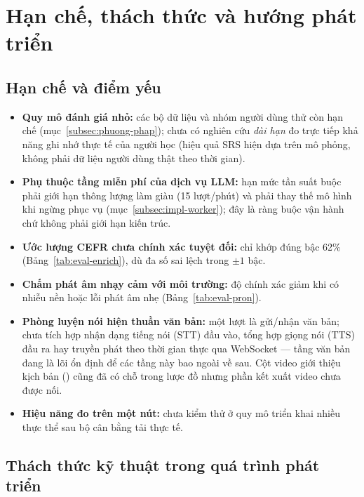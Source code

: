 \section{Hạn chế, thách thức và hướng phát triển}
\label{sec:han-che}

\subsection{Hạn chế và điểm yếu}
\label{subsec:han-che}

\begin{itemize}
  \item \textbf{Quy mô đánh giá nhỏ:} các bộ dữ liệu và nhóm người dùng thử
        còn hạn chế (mục~\ref{subsec:phuong-phap}); chưa có nghiên cứu
        \textit{dài hạn} đo trực tiếp khả năng ghi nhớ thực tế của người học
        (hiệu quả SRS hiện dựa trên mô phỏng, không phải dữ liệu người dùng
        thật theo thời gian).
  \item \textbf{Phụ thuộc tầng miễn phí của dịch vụ LLM:} hạn mức tần suất
        buộc phải giới hạn thông lượng làm giàu (15 lượt/phút) và phải thay
        thế mô hình khi  ngừng phục vụ
        (mục~\ref{subsec:impl-worker}); đây là ràng buộc vận hành chứ không
        phải giới hạn kiến trúc.
  \item \textbf{Ước lượng CEFR chưa chính xác tuyệt đối:} chỉ khớp đúng bậc
        62\% (Bảng~\ref{tab:eval-enrich}), dù đa số sai lệch trong $\pm 1$ bậc.
  \item \textbf{Chấm phát âm nhạy cảm với môi trường:} độ chính xác giảm khi
        có nhiễu nền hoặc lỗi phát âm nhẹ (Bảng~\ref{tab:eval-pron}).
  \item \textbf{Phòng luyện nói hiện thuần văn bản:} một lượt là gửi/nhận văn
        bản; chưa tích hợp nhận dạng tiếng nói (STT) đầu vào, tổng hợp giọng
        nói (TTS) đầu ra hay truyền phát theo thời gian thực qua WebSocket ---
        tầng văn bản đang là lõi ổn định để các tầng này bao ngoài về sau. Cột
        video giới thiệu kịch bản () cũng đã có chỗ trong
        lược đồ nhưng phần kết xuất video chưa được nối.
  \item \textbf{Hiệu năng đo trên một nút:} chưa kiểm thử ở quy mô triển khai
        nhiều thực thể sau bộ cân bằng tải thực tế.
\end{itemize}

\subsection{Thách thức kỹ thuật trong quá trình phát triển}
\label{subsec:thach-thuc}

